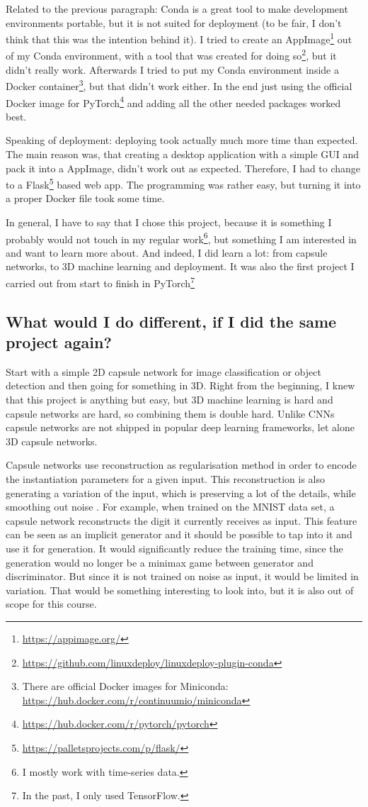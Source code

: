 \documentclass[11pt]{article}
\begin{document}
Related to the previous paragraph: Conda is a great tool to make development environments portable, but it is not suited for deployment (to be fair, I don't think that this was the intention behind it). I tried to create an AppImage\footnote{\url{https://appimage.org/}} out of my Conda environment, with a tool that was created for doing so\footnote{\url{https://github.com/linuxdeploy/linuxdeploy-plugin-conda}}, but it didn't really work. Afterwards I tried to put my Conda environment inside a Docker container\footnote{There are official Docker images for Miniconda: \url{https://hub.docker.com/r/continuumio/miniconda}}, but that didn't work either. In the end just using the official Docker image for PyTorch\footnote{\url{https://hub.docker.com/r/pytorch/pytorch}} and adding all the other needed packages worked best.

Speaking of deployment: deploying took actually much more time than expected. The main reason was, that creating a desktop application with a simple GUI and pack it into a AppImage, didn't work out as expected. Therefore, I had to change to a Flask\footnote{\url{https://palletsprojects.com/p/flask/}} based web app. The programming was rather easy, but turning it into a proper Docker file took some time.

In general, I have to say that I chose this project, because it is something I probably would not touch in my regular work\footnote{I mostly work with time-series data.}, but something I am interested in and want to learn more about. And indeed, I did learn a lot: from capsule networks, to 3D machine learning and deployment. It was also the first project I carried out from start to finish in PyTorch\footnote{In the past, I only used TensorFlow.}

\subsection{What would I do different, if I did the same project again?}
Start with a simple 2D capsule network for image classification or object detection and then going for something in 3D. Right from the beginning, I knew that this project is anything but easy, but 3D machine learning is hard and capsule networks are hard, so combining them is double hard. Unlike CNNs capsule networks are not shipped in popular deep learning frameworks, let alone 3D capsule networks.

Capsule networks use reconstruction as regularisation method in order to encode the instantiation parameters for a given input. This reconstruction is also generating a variation of the input, which is preserving a lot of the details, while smoothing out noise \cite{sabour2017}. For example, when trained on the MNIST data set, a capsule network reconstructs the digit it currently receives as input. This feature can be seen as an implicit generator and it should be possible to tap into it and use it for generation. It would significantly reduce the training time, since the generation would no longer be a minimax game between generator and discriminator. But since it is not trained on noise as input, it would be limited in variation. That would be something interesting to look into, but it is also out of scope for this course.
\end{document}
